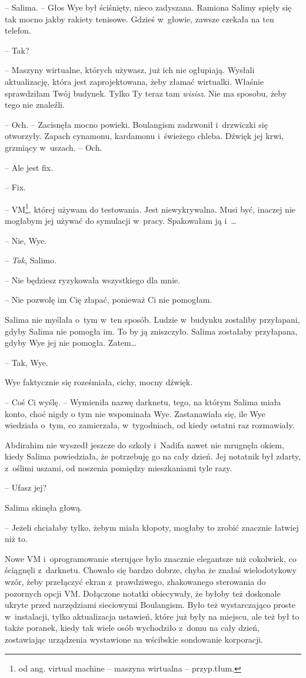 \documentclass[oneside,polish,11pt,sfheadings]{mwbk}
\begin{document}
-- Salima. -- Głos Wye był ściśnięty, nieco zadyszana. Ramiona Salimy
spięły się tak mocno jakby rakiety tenisowe. Gdzieś w~głowie, zawsze
czekała na ten telefon.

-- Tak?

-- Maszyny wirtualne, których używasz, już ich nie ogłupiają. Wysłali
aktualizację, która jest zaprojektowana, żeby złamać wirtualki. Właśnie
sprawdziłam Twój budynek. Tylko Ty teraz tam \textit{wisisz}. Nie ma
sposobu, żeby tego nie znaleźli.

-- Och. -- Zacisnęła mocno powieki. Boulangism zadzwonił i~drzwiczki się
otworzyły. Zapach cynamonu, kardamonu i~świeżego chleba. Dźwięk jej
krwi, grzmiący w~uszach. -- Och.

-- Ale jest fix.

-- Fix.

-- VM\footnote{ od ang. virtual machine -- maszyna wirtualna -- przyp.tłum.}, której używam do
testowania. Jest niewykrywalna. Musi być, inaczej nie mogłabym jej
używać do symulacji w~pracy. Spakowałam ją i~\ldots 

-- Nie, Wye.

-- \textit{Tak}, Salimo.

-- Nie będziesz ryzykowała wszystkiego dla mnie.

-- Nie pozwolę im Cię złapać, ponieważ Ci nie pomogłam.

Salima nie myślała o~tym w~ten sposób. Ludzie w~budynku zostaliby
przyłapani, gdyby Salima nie pomogła im. To by ją zniszczyło. Salima
zostałaby przyłapana, gdyby Wye jej nie pomogła. Zatem\ldots 

-- Tak, Wye.

Wye faktycznie się roześmiała, cichy, mocny dźwięk. 

-- Coś Ci wyślę. -- Wymieniła nazwę darknetu, tego, na którym Salima miała konto, choć nigdy
o tym nie wspominała Wye. Zastanawiała się, ile Wye wiedziała o~tym, co
zamierzała, w~tygodniach, od kiedy ostatni raz rozmawiały.

Abdirahim nie wyszedł jeszcze do szkoły i~Nadifa nawet nie mrugnęła
okiem, kiedy Salima powiedziała, że potrzebuję go na cały dzień. Jej
notatnik był zdarty, z~oślimi uszami, od noszenia pomiędzy mieszkaniami
tyle razy.

-- Ufasz jej?

Salima skinęła głową. 

-- Jeżeli chciałaby tylko, żebym miała kłopoty,
mogłaby to zrobić znacznie łatwiej niż to.

Nowe VM i~oprogramowanie sterujące było znacznie elegantsze niż
cokolwiek, co ściągnęli z~darknetu. Chowało się bardzo dobrze, chyba że
znałaś wielodotykowy wzór, żeby przełączyć ekran z~prawdziwego,
zhakowanego sterowania do pozornych opcji VM. Dołączone notatki
obiecywały, że byłoby też doskonale ukryte przed narzędziami sieciowymi
Boulangism. Było też wystarczająco proste w~instalacji, tylko
aktualizacja ustawień, które już były na miejscu, ale też był to także
poranek, kiedy tak wiele osób wychodziło z~domu na cały dzień,
zostawiając urządzenia wystawione na wścibskie sondowanie korporacji.
\end{document}
